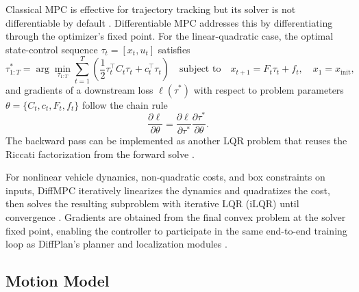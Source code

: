 Classical MPC is effective for trajectory tracking but its solver is not differentiable by default \cite{amos_differentiable_2018, swadiryus_DifferentiableMotionPlanning_2025}.
Differentiable MPC addresses this by differentiating through the optimizer's fixed point.
For the linear-quadratic case, the optimal state-control sequence $\tau_t = [x_t, u_t]$ satisfies
\begin{equation}
    \tau_{1:T}^{*} = \arg\min_{\tau_{1:T}} \sum_{t=1}^{T} \left(\frac{1}{2}\tau_t^{\top} C_t \tau_t + c_t^{\top}\tau_t\right)
    \quad \text{subject to} \quad x_{t+1} = F_t \tau_t + f_t, \quad x_1 = x_{\text{init}},
\end{equation}
and gradients of a downstream loss $\ell(\tau^{*})$ with respect to problem parameters $\theta = \{C_t, c_t, F_t, f_t\}$ follow the chain rule
\begin{equation}
    \frac{\partial \ell}{\partial \theta} = \frac{\partial \ell}{\partial \tau^{*}} \frac{\partial \tau^{*}}{\partial \theta}.
\end{equation}
The backward pass can be implemented as another LQR problem that reuses the Riccati factorization from the forward solve \cite{amos_differentiable_2018, swadiryus_DifferentiableMotionPlanning_2025}.

For nonlinear vehicle dynamics, non-quadratic costs, and box constraints on inputs, DiffMPC iteratively linearizes the dynamics and quadratizes the cost, then solves the resulting subproblem with iterative LQR (iLQR) until convergence \cite{amos_differentiable_2018, swadiryus_DifferentiableMotionPlanning_2025, tungka_diffmpc_2024}.
Gradients are obtained from the final convex problem at the solver fixed point, enabling the controller to participate in the same end-to-end training loop as DiffPlan's planner and localization modules \cite{koch_DifferentiableInterpretablePath_2025, swadiryus_DifferentiableMotionPlanning_2025}.

\subsection{Motion Model}

